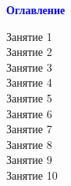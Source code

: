 
\begin{center}
    {\Large \textcolor{blue}{\textbf{Оглавление}}}
\end{center}

\vspace{1em}

\noindent
Занятие 1 \\[0.5em]
Занятие 2 \\[0.5em]
Занятие 3 \\[0.5em]
Занятие 4 \\[0.5em]
Занятие 5 \\[0.5em]
Занятие 6 \\[0.5em]
Занятие 7 \\[0.5em]
Занятие 8 \\[0.5em]
Занятие 9 \\[0.5em]
Занятие 10 \\[0.5em]


\endinput

